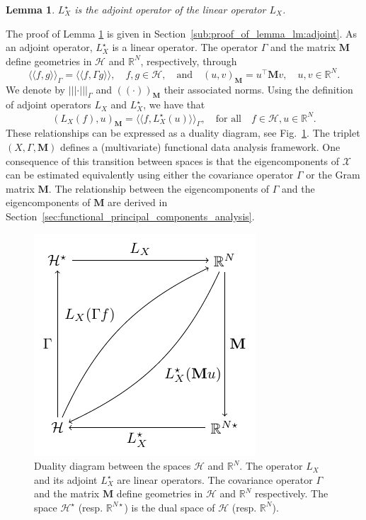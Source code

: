 \documentclass[times,sort&compress,3p]{elsarticle}
\theoremstyle{plain}%
\newtheorem{lemma}{Lemma}
\theoremstyle{definition}
\newcommand{\RR}{\mathbb{R}} %
\newcommand{\HH}{\mathcal{H}} %
\newcommand{\inRM}[2]{\left(#1, #2\right)_{\mathbf{M}}}
\newcommand{\normRM}[1]{\left(\!\left(#1\right)\!\right)_{\mathbf{M}}} %
\newcommand{\inH}[2]{\langle\!\langle#1, #2\rangle\!\rangle}
\newcommand{\inHG}[2]{\langle\!\langle#1, #2\rangle\!\rangle_\Gamma}
\newcommand{\normHG}[1]{\left|\left|\left|#1\right|\right|\right|_\Gamma}
\begin{document}
\begin{lemma}\label{lm:adjoint}
    $L^\star_X$ is the adjoint operator of the linear operator $L_X$.
\end{lemma}
The proof of Lemma \ref{lm:adjoint} is given in Section~\ref{sub:proof_of_lemma_lm:adjoint}. As an adjoint operator, $L^\star_X$ is a linear operator. The operator $\Gamma$ and the matrix $\mathbf{M}$ define geometries in $\HH$ and $\RR^N$, respectively, through
\begin{equation}
\inHG{f}{g} = \inH{f}{\Gamma g},\quad f, g \in \HH, \quad\text{and}\quad \inRM{u}{v} = u^\top \mathbf{M} v,\quad u, v \in \RR^N.
\end{equation}
We denote by $\normHG{\cdot}$ and $\normRM{\cdot}$ their associated norms.
Using the definition of adjoint operators $L_X$ and $L^\star_X$, we have that
\begin{equation}
    \inRM{L_X(f)}{u} = \inHG{f}{L^\star_X(u)}, \quad\text{for all}\quad f \in \HH, u \in \RR^N.
\end{equation}
These relationships can be expressed as a duality diagram, see Fig.~\ref{fig:duality_diagram}. The triplet $(X, \Gamma, \mathbf{M})$ defines a (multivariate) functional data analysis framework. One consequence of this transition between spaces is that the eigencomponents of $\mathcal{X}$ can be estimated equivalently using either the covariance operator $\Gamma$ or the Gram matrix $\mathbf{M}$. The relationship between the eigencomponents of $\Gamma$ and the eigencomponents of $\mathbf{M}$ are derived in Section~\ref{sec:functional_principal_components_analysis}.
\begin{figure}
    \centering
    \includegraphics[scale=0.8]{duality_diagram.pdf}
    \caption{Duality diagram between the spaces $\mathcal{H}$ and $\mathbb{R}^N$. The operator $L_X$ and its adjoint $L^\star_X$ are linear operators. The covariance operator $\Gamma$ and the matrix $\mathbf{M}$ define geometries in $\mathcal{H}$ and $\mathbb{R}^N$ respectively. The space $\HH^\star$ (resp. $\RR^{N \star}$) is the dual space of $\HH$ (resp. $\RR^N$).}
    \label{fig:duality_diagram}
\end{figure}
\end{document}
